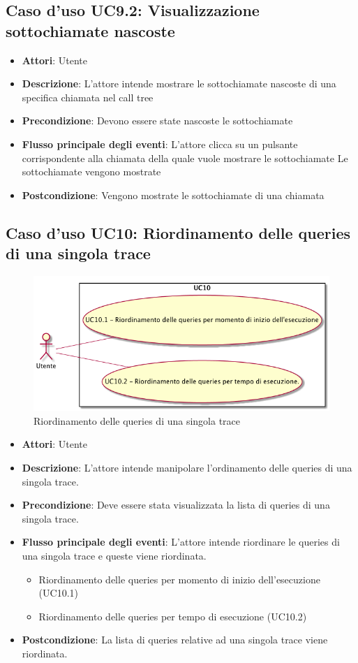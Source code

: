 \subsection{Caso d'uso UC9.2: Visualizzazione sottochiamate nascoste}
\begin{itemize}
\item \textbf{Attori}: Utente
\item \textbf{Descrizione}: L'attore intende mostrare le sottochiamate nascoste di una specifica chiamata nel call tree
\item \textbf{Precondizione}: Devono essere state nascoste le sottochiamate
\item \textbf{Flusso principale degli eventi}: L'attore clicca su un pulsante corrispondente alla chiamata della quale vuole mostrare le sottochiamate
Le sottochiamate vengono mostrate
\item \textbf{Postcondizione}: Vengono mostrate le sottochiamate di una chiamata
\end{itemize}
\subsection{Caso d'uso UC10: Riordinamento delle queries di una singola trace}
\begin{figure} [H]
\centering
\includegraphics[scale=0.45]{./UC/UC10.png}
\caption{Riordinamento delle queries di una singola trace}\label{}
\end{figure}
\begin{itemize}
\item \textbf{Attori}: Utente
\item \textbf{Descrizione}: L'attore intende manipolare l'ordinamento delle queries di una singola trace.
\item \textbf{Precondizione}: Deve essere stata visualizzata la lista di queries di una singola trace.
\item \textbf{Flusso principale degli eventi}: L'attore intende riordinare le queries di una singola trace e queste viene riordinata.
\begin{itemize}
\item Riordinamento delle queries per momento di inizio dell'esecuzione (UC10.1)
\item Riordinamento delle queries per tempo di esecuzione (UC10.2)
\end{itemize}
\item \textbf{Postcondizione}: La lista di queries relative ad una singola trace viene riordinata.
\end{itemize}
